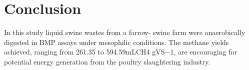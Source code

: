 \section{Conclusion}
In this study liquid swine wastes from a farrow- swine farm were anaerobically digested in BMP assays under mesophilic conditions. The methane yields achieved, ranging from 261.35 to 594.59mLCH4 gVS−1, are encouraging for potential energy generation from the poultry slaughtering industry.